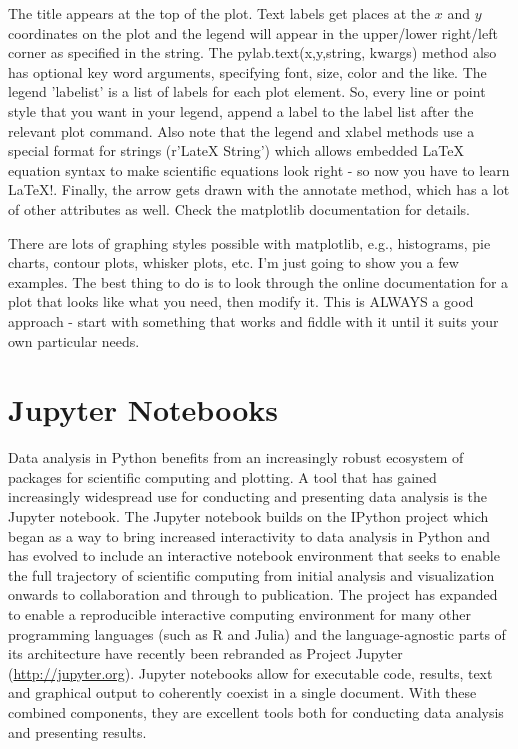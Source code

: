 \documentclass[11pt]{book}
\begin{document}
{{{{{{The title appears at the top of the plot.
    Text labels get places at the $x$ and $y$ coordinates on the plot and the legend will appear in the upper/lower right/left corner as specified in the string.  The {\color{blue}pylab.text(x,y,string, kwargs)} method also has optional key word arguments, specifying font, size, color and the like.     The legend 'labelist' is a list of labels for each plot element.  So, every line or point style that you want in your legend, append a label to the label list after the relevant plot command. Also note that the legend and xlabel methods use  a special format for strings ({\color{blue}r'LateX String')} which allows embedded LaTeX equation syntax  to make scientific equations look right - so now you have to learn LaTeX!.   Finally, the arrow gets drawn with the {\color{blue}annotate} method, which has a lot of other attributes as well.
Check the {\color{blue}matplotlib} documentation for details.

There are lots of graphing styles possible with {\color{blue}matplotlib}, e.g., histograms, pie charts, contour plots, whisker plots, etc.  I'm just going to show you a few examples.  The best thing to do is to look through the online documentation for a plot that looks like what you need, then modify it.  This is ALWAYS a good approach - start with something that works and fiddle with it until it suits your own particular needs.


\chapter{Jupyter Notebooks}

Data analysis in Python benefits from an increasingly robust ecosystem of packages for scientific computing and plotting. A tool that has gained increasingly widespread use for conducting and presenting data analysis is the Jupyter notebook. The Jupyter notebook builds on the IPython project which began as a way to bring increased interactivity to data analysis in Python \citep{perez07} and has evolved to include an interactive notebook environment that seeks to enable the full trajectory of scientific computing from initial analysis and visualization onwards to collaboration and through to publication. The project has expanded to enable a reproducible interactive computing environment for many other programming languages (such as R and Julia) and the language-agnostic parts of its architecture have recently been rebranded as Project Jupyter (\url{http://jupyter.org}). Jupyter notebooks allow for executable code, results, text and graphical output to coherently coexist in a single document. With these combined components, they are excellent tools both for conducting data analysis and presenting results.

}}}}}}
\end{document}
